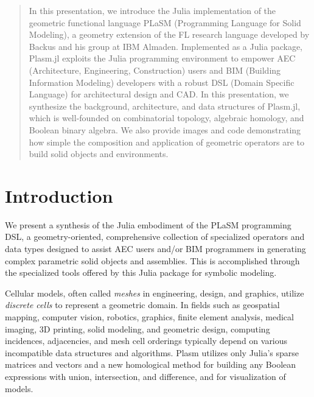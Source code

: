 \documentclass{juliacon}
\begin{document}


\def\E{\mathbb{E}}
\def\R{\mathbb{R}}
\def\Z{\mathbb{Z}}
\def\N{\mathbb{N}}
\def\P{\mathbb{P}}
\def\v#1{{\bf #1}}
\def\p#1{{\bf #1}}
\def\T#1{{\bf #1}}

\maketitle


\begin{abstract}

In this presentation, we introduce the Julia implementation of the geometric functional language PLaSM (Programming Language for Solid Modeling), a geometry extension of the FL research language developed by Backus and his group at IBM Almaden. Implemented as a Julia package, Plasm.jl exploits the Julia programming environment to empower AEC (Architecture, Engineering, Construction) users and BIM (Building Information Modeling) developers with a robust DSL (Domain Specific Language) for architectural design and CAD. In this presentation, we synthesize the background, architecture, and data structures of Plasm.jl, which is well-founded on combinatorial topology, algebraic homology, and Boolean binary algebra. We also provide images and code demonstrating how simple the composition and application of geometric operators are to build solid objects and environments.

\end{abstract}



\tableofcontents

\section{Introduction}
\label{sec:additional_faci}

We present a synthesis of the Julia embodiment of the PLaSM programming DSL, a geometry-oriented, comprehensive collection of specialized operators and data types designed to assist AEC users and/or BIM programmers in generating complex parametric solid objects and assemblies. This is accomplished through the specialized tools offered by this Julia package for symbolic modeling. 

Cellular models, often called \emph{meshes} in engineering, design, and graphics, utilize \emph{discrete cells} to represent a geometric domain. In fields such as geospatial mapping, computer vision, robotics, graphics, finite element analysis, medical imaging, 3D printing, solid modeling, and geometric design, computing incidences, adjacencies, and mesh cell orderings typically depend on various incompatible data structures and algorithms. Plasm utilizes only Julia’s sparse matrices and vectors and a new homological method for building any Boolean expressions with union, intersection, and difference, and for visualization of models. 
\end{document}
